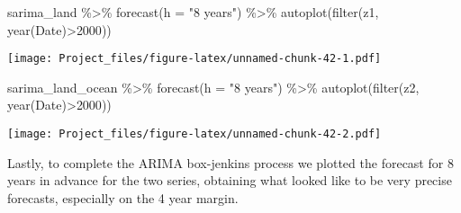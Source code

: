 \documentclass[
]{article}
\newenvironment{Shaded}{\begin{snugshade}}{\end{snugshade}}
\newcommand{\AttributeTok}[1]{\textcolor[rgb]{0.77,0.63,0.00}{#1}}
\newcommand{\DecValTok}[1]{\textcolor[rgb]{0.00,0.00,0.81}{#1}}
\newcommand{\FunctionTok}[1]{\textcolor[rgb]{0.00,0.00,0.00}{#1}}
\newcommand{\NormalTok}[1]{#1}
\newcommand{\SpecialCharTok}[1]{\textcolor[rgb]{0.00,0.00,0.00}{#1}}
\newcommand{\StringTok}[1]{\textcolor[rgb]{0.31,0.60,0.02}{#1}}
\begin{document}
\begin{Shaded}
\begin{Highlighting}[]
\NormalTok{sarima\_land }\SpecialCharTok{\%\textgreater{}\%} \FunctionTok{forecast}\NormalTok{(}\AttributeTok{h =} \StringTok{"8 years"}\NormalTok{) }\SpecialCharTok{\%\textgreater{}\%} 
  \FunctionTok{autoplot}\NormalTok{(}\FunctionTok{filter}\NormalTok{(z1, }\FunctionTok{year}\NormalTok{(Date)}\SpecialCharTok{\textgreater{}}\DecValTok{2000}\NormalTok{))}
\end{Highlighting}
\end{Shaded}

\texttt{[image: Project\_files/figure-latex/unnamed-chunk-42-1.pdf]}

\begin{Shaded}
\begin{Highlighting}[]
\NormalTok{sarima\_land\_ocean }\SpecialCharTok{\%\textgreater{}\%} \FunctionTok{forecast}\NormalTok{(}\AttributeTok{h =} \StringTok{"8 years"}\NormalTok{) }\SpecialCharTok{\%\textgreater{}\%} 
  \FunctionTok{autoplot}\NormalTok{(}\FunctionTok{filter}\NormalTok{(z2, }\FunctionTok{year}\NormalTok{(Date)}\SpecialCharTok{\textgreater{}}\DecValTok{2000}\NormalTok{))}
\end{Highlighting}
\end{Shaded}

\texttt{[image: Project\_files/figure-latex/unnamed-chunk-42-2.pdf]}

Lastly, to complete the ARIMA box-jenkins process we plotted the
forecast for 8 years in advance for the two series, obtaining what
looked like to be very precise forecasts, especially on the 4 year
margin.
\end{document}
